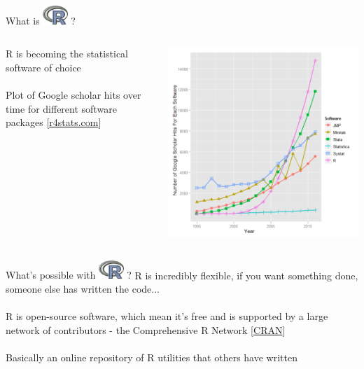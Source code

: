 \documentclass[xcolor=svgnames]{beamer}
\begin{document}
\begin{frame}[t]{What is \includegraphics[width=0.07\textwidth]{Rlogo.jpg} \hspace{0.2em}? }
\vspace{-0.1in}
\begin{columns}
\begin{column}{0.4\textwidth}
R is becoming the statistical software of choice\\~\\
Plot of Google scholar hits over time for different software packages
[\href{http://r4stats.com/articles/popularity/}{r4stats.com}]
\end{column}
\begin{column}{0.5\textwidth}
\begin{center}
\includegraphics[width=1.1\textwidth]{r_google.png}
\end{center}
\end{column}
\end{columns}
\end{frame}

\begin{frame}{What's possible with \includegraphics[width=0.07\textwidth]{Rlogo.jpg} \hspace{0.2em}? }
R is incredibly flexible, if you want something done, someone else has written the code...\\~\\
R is open-source software, which mean it's free and is supported by a large network of contributors - the Comprehensive R Network [\href{http://cran.us.r-project.org/}{CRAN}]\\~\\
Basically an online repository of R utilities that others have written
\end{frame}
\end{document}
